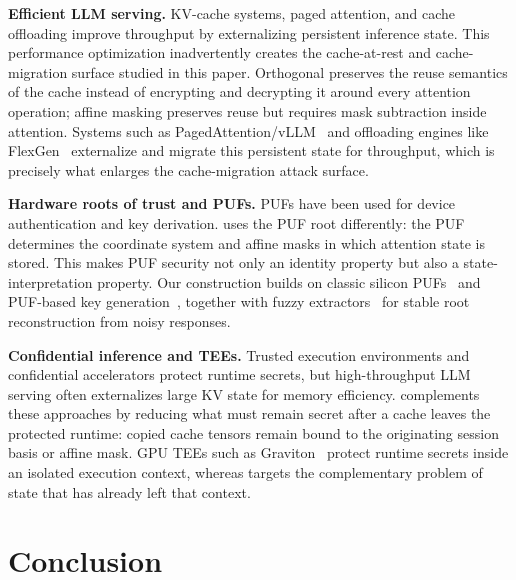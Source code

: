 \textbf{Efficient LLM serving.} KV-cache systems, paged attention, and cache offloading improve throughput by externalizing persistent inference state. This performance optimization inadvertently creates the cache-at-rest and cache-migration surface studied in this paper. Orthogonal \sys{} preserves the reuse semantics of the cache instead of encrypting and decrypting it around every attention operation; affine masking preserves reuse but requires mask subtraction inside attention. Systems such as PagedAttention/vLLM~\cite{pagedattention} and offloading engines like FlexGen~\cite{flexgen} externalize and migrate this persistent state for throughput, which is precisely what enlarges the cache-migration attack surface.

\textbf{Hardware roots of trust and PUFs.} PUFs have been used for device authentication and key derivation. \sys{} uses the PUF root differently: the PUF determines the coordinate system and affine masks in which attention state is stored. This makes PUF security not only an identity property but also a state-interpretation property. Our construction builds on classic silicon PUFs~\cite{gassend_silicon} and PUF-based key generation~\cite{suh_devadas_puf}, together with fuzzy extractors~\cite{dodis_fuzzy} for stable root reconstruction from noisy responses.

\textbf{Confidential inference and TEEs.} Trusted execution environments and confidential accelerators protect runtime secrets, but high-throughput LLM serving often externalizes large KV state for memory efficiency. \sys{} complements these approaches by reducing what must remain secret after a cache leaves the protected runtime: copied cache tensors remain bound to the originating session basis or affine mask. GPU TEEs such as Graviton~\cite{graviton} protect runtime secrets inside an isolated execution context, whereas \sys{} targets the complementary problem of state that has already left that context.

\section{Conclusion}
\label{sec:conclusion}

